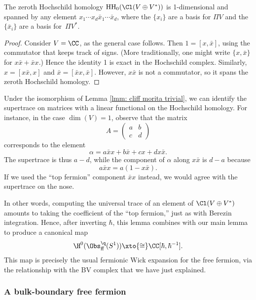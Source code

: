 \documentclass[10pt]{amsart}
\begin{document}
\begin{crl}
The zeroth Hochschild homology ${\rm HH}_0(\Cl(V \oplus V^*))$ is 1-dimensional
and spanned by any element $x_1 \cdots x_d \bar{x}_1 \cdots \bar{x}_d$, 
where the $\{x_i\}$ are a basis for $\Pi V$ and the $\{\bar{x}_i\}$ are a basis for~$\Pi V^*$.
\end{crl}

\begin{proof}
Consider $V = \CC$, as the general case follows. 
Then $1 = [x,\bar{x}]$, using the commutator that keeps track of signs. 
(More traditionally, one might write $\{x,\bar{x}\}$ for $x\bar{x} + \bar{x}x$.)
Hence the identity 1 is exact in the Hochschild complex.
Similarly, $x = [x\bar{x},x]$ and $\bar{x} = [\bar{x}x,\bar{x}]$.
However, $x\bar{x}$ is not a commutator, so it spans the zeroth Hochschild homology.
\end{proof}

Under the isomorphism of Lemma \ref{lmm: cliff morita trivial}, 
we can identify the supertrace on matrices with a linear functional on the Hochschild homology.
For instance, in the case $\dim(V) = 1$, observe that 
the matrix 
\[
A=\begin{pmatrix}
a & b \\
c & d
\end{pmatrix}
\]
corresponds to the element 
\[
\alpha=a \bar{x} x + b \bar{x} + c x + d x \bar{x}.
\]
The supertrace is thus $a-d$, while the component of $\alpha$ along $x \bar{x}$ is $d-a$
because
\[
a \bar{x} x = a (1- x \bar{x}).
\]
If we used the ``top fermion'' component $\bar{x} x$ instead,
we would agree with the supertrace on the nose.

In other words, computing the universal trace of an element of $\Cl(V \oplus V^*)$ amounts to taking the coefficient of the ``top fermion,'' just as with Berezin integration.
Hence, after inverting $\hbar$, this lemma combines with our main lemma to produce a canonical map
\[
\H^0(\Obs^\q_{\rm ff}(S^1)) \xto{\cong} \CC[\hbar,\hbar^{-1}].
\]
This map is precisely the usual fermionic Wick expansion for the free fermion, 
via the relationship with the BV complex that we have just explained.

\subsubsection{A bulk-boundary free fermion}
\label{sec: bb ff}
\end{document}
